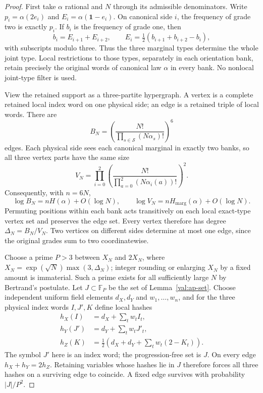 \begin{proof}
First take $\alpha$ rational and $N$ through its admissible denominators.
Write $p_i=\alpha(2e_i)$ and $E_i=\alpha(\mathbf1-e_i)$.  On canonical
side $i$, the frequency of grade two is exactly $p_i$.  If $b_i$ is the
frequency of grade one, then
\[
 b_i=E_{i+1}+E_{i+2},\qquad
 E_i=\tfrac12(b_{i+1}+b_{i+2}-b_i),
\]
with subscripts modulo three.  Thus the three marginal types determine the
whole joint type.  Local restrictions to those types, separately in each
orientation bank, retain precisely the original words of canonical law
$\alpha$ in every bank.  No nonlocal joint-type filter is used.

View the retained support as a three-partite hypergraph.  A vertex is a
complete retained local index word on one physical side; an edge is a
retained triple of local words.  There are
\[
 B_N=\left(\frac{N!}{\prod_{s\in\mathcal S}(N\alpha_s)!}\right)^6
\]
edges.  Each physical side sees each canonical marginal in exactly two
banks, so all three vertex parts have the same size
\[
 V_N=\prod_{i=0}^2
 \left(\frac{N!}{\prod_{a=0}^2(N\alpha_i(a))!}\right)^2.
\]
Consequently, with $n=6N$,
\begin{equation}
 \log B_N=nH(\alpha)+O(\log N),\qquad
 \log V_N=nH_{\mathrm{marg}}(\alpha)+O(\log N).
\label{val:matching-counts}
\end{equation}
Permuting positions within each bank acts transitively on each local
exact-type vertex set and preserves the edge set.  Every vertex therefore
has degree $\Delta_N=B_N/V_N$.  Two vertices on different sides determine
at most one edge, since the original grades sum to two coordinatewise.

Choose a prime $P>3$ between $X_N$ and $2X_N$, where
$X_N=\exp(\sqrt N)\max(3,\Delta_N)$; integer rounding or enlarging $X_N$
by a fixed amount is immaterial.  Such a prime exists for all sufficiently
large $N$ by Bertrand's postulate.  Let $J\subset\mathbb F_P$ be the set
of Lemma~\ref{val:ap-set}.  Choose independent uniform field elements
$d_X,d_Y$ and $w_1,\ldots,w_n$, and for the three physical index words
$I,J',K$ define local hashes
\begin{align*}
 h_X(I)&=d_X+\sum_t w_t I_t,\\
 h_Y(J')&=d_Y+\sum_t w_t J'_t,\\
 h_Z(K)&=\tfrac12\left(d_X+d_Y+\sum_t w_t(2-K_t)\right).
\end{align*}
The symbol $J'$ here is an index word; the progression-free set is $J$.
On every edge $h_X+h_Y=2h_Z$.  Retaining variables whose hashes lie in
$J$ therefore forces all three hashes on a surviving edge to coincide.
A fixed edge survives with probability $|J|/P^2$.


\end{proof}
